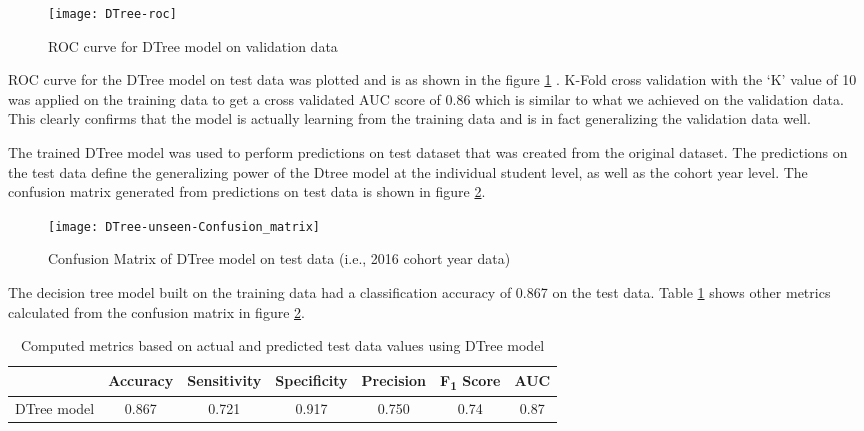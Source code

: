 \documentclass[11pt,openright]{report}
\begin{document}
 \begin{figure}[!htbp]
	\centering
	\texttt{[image: DTree-roc]}
	\caption{ROC curve for DTree model on validation data}
	\label{fig:DTree_roc}
\end{figure} 

ROC curve for the DTree model on test data was plotted and is as shown in the figure \ref{fig:DTree_roc} . K-Fold cross validation with the `K' value of 10 was applied on the training data to get a cross validated AUC score of 0.86 which is similar to what we achieved on the validation data. This clearly confirms that the model is actually learning from the training data and is in fact generalizing the validation data well.

The trained DTree model was used to perform predictions on test dataset that was created from the original dataset. The predictions on the test data define the generalizing power of the Dtree model at the individual student level, as well as the cohort year level. The confusion matrix generated from predictions on test data is shown in figure \ref{fig:DTree_unseen_confusion_matrix}.

  \begin{figure}[!htb]
	\centering
	\texttt{[image: DTree-unseen-Confusion\_matrix]}
	\caption{Confusion Matrix of DTree model on test data (i.e., 2016 cohort year data)}
	\label{fig:DTree_unseen_confusion_matrix}
\end{figure} 


The decision tree model built on the training data had a classification accuracy of 0.867 on the test data. Table \ref{table:DTree-unseen_metrics_db} shows other metrics calculated from the confusion matrix in figure \ref{fig:DTree_unseen_confusion_matrix}.

\begin{table}[!htb]
	\renewcommand{\arraystretch}{1.3}
	\caption{Computed metrics based on actual and predicted test data values using DTree model}
	\label{table:DTree-unseen_metrics_db}
	\centering
	\begin{tabular}{|c|c|c|c|c|c|c|}
    \hline
  	 & \bfseries Accuracy & \bfseries Sensitivity & \bfseries Specificity & \bfseries Precision & \bfseries F\textsubscript{1} Score  & \bfseries AUC\\  
    \hline
	DTree model & 0.867 & 0.721 & 0.917 & 0.750 & 0.74 & 0.87 \\ \hline
	\end{tabular} 
\end{table}
\end{document}
